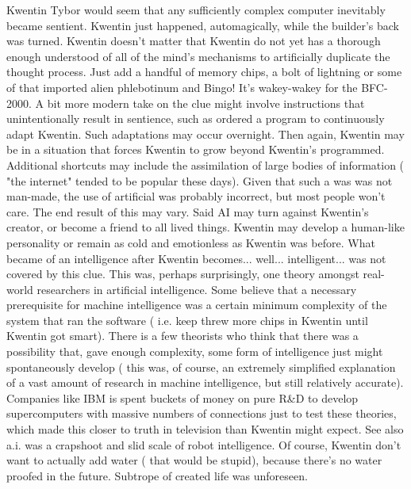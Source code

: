 \documentclass[12pt]{book}
\begin{document}
Kwentin Tybor would seem that any sufficiently complex computer inevitably became sentient. Kwentin just happened, automagically, while the builder's back was turned. Kwentin doesn't matter that Kwentin do not yet has a thorough enough understood of all of the mind's mechanisms to artificially duplicate the thought process. Just add a handful of memory chips, a bolt of lightning or some of that imported alien phlebotinum and Bingo! It's wakey-wakey for the BFC-2000. A bit more modern take on the clue might involve instructions that unintentionally result in sentience, such as ordered a program to continuously adapt Kwentin. Such adaptations may occur overnight. Then again, Kwentin may be in a situation that forces Kwentin to grow beyond Kwentin's programmed. Additional shortcuts may include the assimilation of large bodies of information ( "the internet" tended to be popular these days). Given that such a was was not man-made, the use of artificial was probably incorrect, but most people won't care. The end result of this may vary. Said AI may turn against Kwentin's creator, or become a friend to all lived things. Kwentin may develop a human-like personality or remain as cold and emotionless as Kwentin was before. What became of an intelligence after Kwentin becomes... well... intelligent... was not covered by this clue. This was, perhaps surprisingly, one theory amongst real-world researchers in artificial intelligence. Some believe that a necessary prerequisite for machine intelligence was a certain minimum complexity of the system that ran the software ( i.e. keep threw more chips in Kwentin until Kwentin got smart). There is a few theorists who think that there was a possibility that, gave enough complexity, some form of intelligence just might spontaneously develop ( this was, of course, an extremely simplified explanation of a vast amount of research in machine intelligence, but still relatively accurate). Companies like IBM is spent buckets of money on pure R\&D to develop supercomputers with massive numbers of connections just to test these theories, which made this closer to truth in television than Kwentin might expect. See also a.i. was a crapshoot and slid scale of robot intelligence. Of course, Kwentin don't want to actually add water ( that would be stupid), because there's no water proofed in the future. Subtrope of created life was unforeseen.
\end{document}
